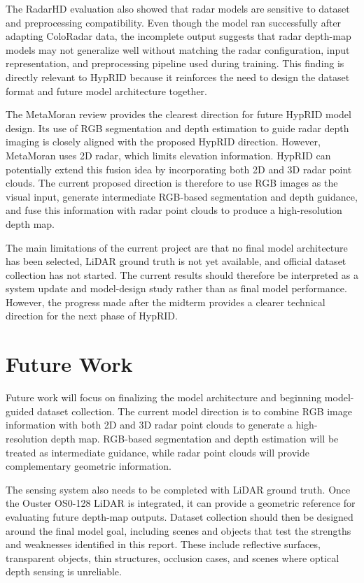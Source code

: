 \documentclass[conference]{IEEEtran}
\begin{document}
The RadarHD evaluation also showed that radar models are sensitive to dataset and preprocessing compatibility. Even though the model ran successfully after adapting ColoRadar data, the incomplete output suggests that radar depth-map models may not generalize well without matching the radar configuration, input representation, and preprocessing pipeline used during training. This finding is directly relevant to HypRID because it reinforces the need to design the dataset format and future model architecture together.

The MetaMoran review provides the clearest direction for future HypRID model design. Its use of RGB segmentation and depth estimation to guide radar depth imaging is closely aligned with the proposed HypRID direction. However, MetaMoran uses 2D radar, which limits elevation information. HypRID can potentially extend this fusion idea by incorporating both 2D and 3D radar point clouds. The current proposed direction is therefore to use RGB images as the visual input, generate intermediate RGB-based segmentation and depth guidance, and fuse this information with radar point clouds to produce a high-resolution depth map.

The main limitations of the current project are that no final model architecture has been selected, LiDAR ground truth is not yet available, and official dataset collection has not started. The current results should therefore be interpreted as a system update and model-design study rather than as final model performance. However, the progress made after the midterm provides a clearer technical direction for the next phase of HypRID.

\section{Future Work}

Future work will focus on finalizing the model architecture and beginning model-guided dataset collection. The current model direction is to combine RGB image information with both 2D and 3D radar point clouds to generate a high-resolution depth map. RGB-based segmentation and depth estimation will be treated as intermediate guidance, while radar point clouds will provide complementary geometric information.

The sensing system also needs to be completed with LiDAR ground truth. Once the Ouster OS0-128 LiDAR is integrated, it can provide a geometric reference for evaluating future depth-map outputs. Dataset collection should then be designed around the final model goal, including scenes and objects that test the strengths and weaknesses identified in this report. These include reflective surfaces, transparent objects, thin structures, occlusion cases, and scenes where optical depth sensing is unreliable.
\end{document}
